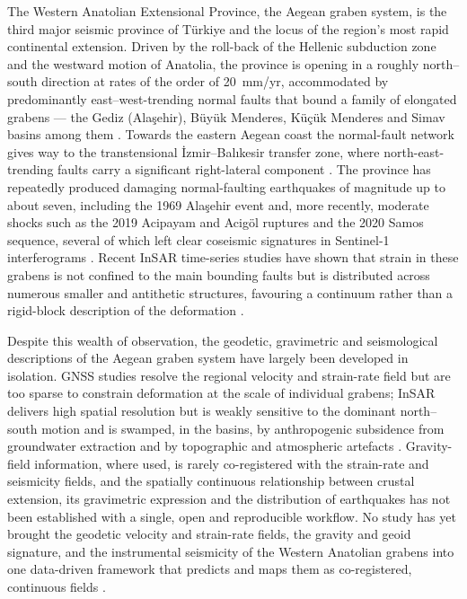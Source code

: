 \documentclass[pdflatex,sn-mathphys-num]{sn-jnl}%
\theoremstyle{thmstyleone}%
\theoremstyle{thmstyletwo}%
\theoremstyle{thmstylethree}%
\begin{document}
The Western Anatolian Extensional Province, the Aegean graben system, is the third
major seismic province of T\"{u}rkiye and the locus of the region's most rapid
continental extension. Driven by the roll-back of the Hellenic subduction zone and
the westward motion of Anatolia, the province is opening in a roughly north--south
direction at rates of the order of 20~mm/yr, accommodated by predominantly
east--west-trending normal faults that bound a family of elongated grabens --- the
Gediz (Ala\c{s}ehir), B\"{u}y\"{u}k Menderes, K\"{u}\c{c}\"{u}k Menderes and Simav
basins among them
\cite{McKenzie1972,Jackson1994,Aktug2009,LePichonAngelier1979,SengorYilmaz1981,Bozkurt2001,Jolivet2013,BozkurtSozbilir2004,TenVeen2009}. Towards
the eastern Aegean coast the normal-fault network gives way to the transtensional
\.{I}zmir--Bal\i kesir transfer zone, where north-east-trending faults carry a
significant right-lateral component
\cite{Uzel2012,Taymaz2007,Lemenkova202215,Nissen2022,Kocyigit2005}. The province has repeatedly produced
damaging normal-faulting earthquakes of magnitude up to about seven, including the
1969 Ala\c{s}ehir event and, more recently, moderate shocks such as the 2019
Acipayam and Acig\"{o}l ruptures and the 2020 Samos sequence, several of which left
clear coseismic signatures in Sentinel-1 interferograms
\cite{EyidoganJackson1985,Yang2020,Nissen2022,Storchak2013}. Recent InSAR
time-series studies have shown that strain in these grabens is not confined to the
main bounding faults but is distributed across numerous smaller and antithetic
structures, favouring a continuum rather than a rigid-block description of the
deformation \cite{Diercks2024,Weiss2020,Aktug2009}.

Despite this wealth of observation, the geodetic, gravimetric and seismological
descriptions of the Aegean graben system have largely been developed in isolation.
GNSS studies resolve the regional velocity and strain-rate field but are too sparse
to constrain deformation at the scale of individual grabens; InSAR delivers high
spatial resolution but is weakly sensitive to the dominant north--south motion and
is swamped, in the basins, by anthropogenic subsidence from groundwater extraction
and by topographic and atmospheric artefacts
\cite{Wright2004,Diercks2024,Dogan2022,Imamoglu2022}. Gravity-field information, where used,
is rarely co-registered with the strain-rate and seismicity fields, and the
spatially continuous relationship between crustal extension, its gravimetric
expression and the distribution of earthquakes has not been established with a
single, open and reproducible workflow. No study has yet brought the geodetic
velocity and strain-rate fields, the gravity and geoid signature, and the
instrumental seismicity of the Western Anatolian grabens into one data-driven
framework that predicts and maps them as co-registered, continuous fields
\cite{Diercks2024,Weiss2020,Ergintav2023}.
\end{document}
